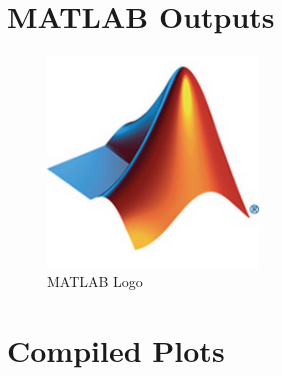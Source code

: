 \documentclass{article}
\begin{document}

% 
% 
% 
% 

\section{MATLAB Outputs}
\begin{figure}[h]
    \centering
    \includegraphics[width=0.5\textwidth]{misc_media/Matlab-Logo.jpg}
    \caption{MATLAB Logo}  %
    \label{fig:matlab-logo} %
\end{figure}

\vspace{2cm}  %


% 



\section{Compiled Plots}


\end{document}
